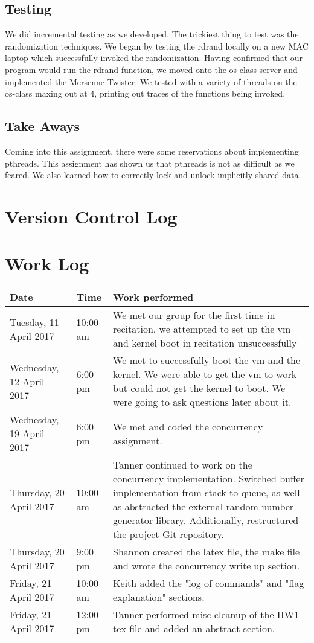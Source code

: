 \documentclass[letterpaper,10pt,serif,draftclsnofoot,onecolumn,compsoc,titlepage]{article}%
\begin{document}
\subsection{Testing}
We did incremental testing as we developed. The trickiest thing to test was
the randomization techniques. We began by testing the rdrand locally on a
new MAC laptop which successfully invoked the randomization. Having
confirmed that our program would run the rdrand function, we moved onto
the os-class server and implemented the Mersenne Twister. We tested with a
variety of threads on the os-class maxing out at 4, printing out traces of
the functions being invoked.
\subsection{Take Aways}
Coming into this assignment, there were some reservations about implementing
 pthreads. This assignment has shown us that pthreads is not as difficult as
 we feared. We also learned how to correctly lock and unlock implicitly
 shared data.
\section{Version Control Log}

\section{Work Log}
\begin{tabular}{| p{4.5cm} | p{1.5cm} | p{10.5cm} |}
\hline
Date & Time & Work performed \\ \hline
Tuesday, 11 April 2017 & 10:00 am & We met our group for the first time in
 recitation, we attempted to set up the vm and kernel boot in recitation
  unsuccessfully \\ \hline
Wednesday, 12 April 2017 & 6:00 pm & We met to successfully boot the vm and
the kernel. We were able to get the vm to work but could not get the kernel
to boot. We were going to ask questions later about it.\\ \hline
Wednesday, 19 April 2017 & 6:00 pm & We met and coded the concurrency
assignment.\\ \hline
Thursday, 20 April 2017 & 10:00 am & Tanner continued to work on the
concurrency implementation. Switched buffer implementation from stack to
queue, as well as abstracted the external random number generator library.
Additionally, restructured the project Git repository. \\ \hline
Thursday, 20 April 2017 & 9:00 pm & Shannon created the latex file, the
make file and wrote the concurrency write up section. \\ \hline
Friday, 21 April 2017 & 10:00 am & Keith added the "log of commands" and
"flag explanation" sections. \\ \hline
Friday, 21 April 2017 & 12:00 pm & Tanner performed misc cleanup of the HW1
tex file and added an abstract section. \\ \hline
\end{tabular}
\end{document}
